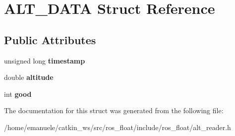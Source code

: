 \hypertarget{structALT__DATA}{}\section{A\+L\+T\+\_\+\+D\+A\+TA Struct Reference}
\label{structALT__DATA}
\subsection*{Public Attributes}
\begin{DoxyCompactItemize}
\item 
\mbox{\label{structALT__DATA_a9978c559e601522f70998dd5b6779828}} 
unsigned long {\bfseries timestamp}
\item 
\mbox{\label{structALT__DATA_a0c4bc1c302556e5b3928562c47abb3f7}} 
double {\bfseries altitude}
\item 
\mbox{\label{structALT__DATA_ad6f0c93f0a6e1ef022fb2fda6b0f06db}} 
int {\bfseries good}
\end{DoxyCompactItemize}


The documentation for this struct was generated from the following file\+:\begin{DoxyCompactItemize}
\item 
/home/emanuele/catkin\+\_\+ws/src/ros\+\_\+float/include/ros\+\_\+float/alt\+\_\+reader.\+h\end{DoxyCompactItemize}
